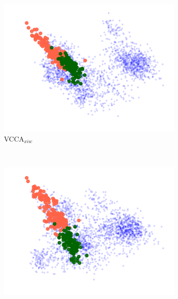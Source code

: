 \begin{figure}[t]
\begin{subfigure}[b]{0.3\textwidth}
         \label{fig:pca_vcca_xw_apples}
     \end{subfigure} 
     \begin{subfigure}[b]{0.3\textwidth}
         \centering
         \includegraphics[width=\textwidth]{figures_and_tables/latent_space_visualizations/apples_new/pca_latent_apples_vcca_xiw_seed2.png}
         \caption{VCCA$_{x i w}$}
         \label{fig:pca_vcca_xiw_apples}
     \end{subfigure} \\
     \begin{subfigure}[b]{0.3\textwidth}
         \centering
         \includegraphics[width=\textwidth]{figures_and_tables/latent_space_visualizations/apples_new/pca_latent_apples_vcca_xiy_seed2.png}

\end{subfigure}
\end{figure}
